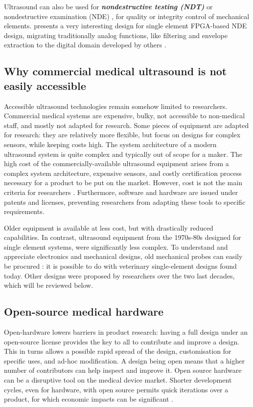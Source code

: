 \documentclass{article}
\begin{document}
Ultrasound can also be used for \textbf{\textit{nondestructive testing (NDT)}} or nondestructive examination (NDE)  \cite{duncan_real-time_1990}, for quality or integrity control of mechanical elements. \cite{fritsch_full_nodate} presents a very interesting design for single element FPGA-based NDE design, migrating traditionally analog functions, like filtering and envelope extraction to the digital domain developed by others  \cite{triger_modular_2008,shrisha_fpga_2018,rodriguez-olivares_improvement_2018}. 

\subsection{Why commercial medical ultrasound is not easily accessible}

Accessible ultrasound technologies remain somehow limited to researchers. Commercial medical systems are expensive, bulky, not accessible to non-medical staff, and mostly not adapted for research. Some pieces of equipment are adapted for research: they are relatively more flexible, but focus on designs for complex sensors, while keeping costs high. The system architecture of a modern ultrasound system is quite complex and typically out of scope for a maker. The high cost of the commercially-available ultrasound equipment arises from a complex system architecture, expensive sensors, and costly certification process necessary for a product to be put on the market. However, cost is not the main criteria for researchers \cite{chagas_haves_2018}. Furthermore, software and hardware are issued under patents and licenses, preventing researchers from adapting these tools to specific requirements.

Older equipment is available at less cost, but with drastically reduced capabilities. In contrast, ultrasound equipment from the 1970s-80s designed for single element systems, were significantly less complex. To understand and appreciate electronics and mechanical designs, old mechanical probes can easily be procured : it is possible to do with veterinary single-element designs found today. Other designs were proposed by researchers over the two last decades, which will be reviewed below. 

\subsection{Open-source medical hardware}

Open-hardware lowers barriers \cite{pandey_open_2019} in product research: having a full design under an open-source license provides the key to all to contribute and improve a design. This in turns allows a possible rapid spread of the design, customisation for specific uses, and ad-hoc modification. A design being open means that a higher number of contributors can help inspect and improve it. Open source hardware can be a disruptive tool on the medical device market. Shorter development cycles, even for hardware, with open source permits quick iterations over a product, for which economic impacts can be significant \cite{pearce_quantifying_2015,pearce_return_2016,moritz_economic_2019,winter_open_2019}.
\end{document}
